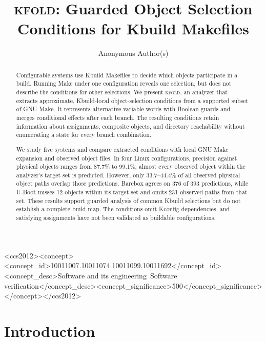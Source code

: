 \documentclass[acmsmall,screen,review]{acmart}
\newcommand{\tool}{\textsc{kfold}\xspace}
\begin{document}
\title{\tool: Guarded Object Selection Conditions for Kbuild Makefiles}

\author{Anonymous Author(s)}

\begin{abstract}
Configurable systems use Kbuild Makefiles to decide which objects participate in a build. Running Make under one configuration reveals one selection, but does not describe the conditions for other selections. We present \tool, an analyzer that extracts approximate, Kbuild-local object-selection conditions from a supported subset of GNU Make. It represents alternative variable words with Boolean guards and merges conditional effects after each branch. The resulting conditions retain information about assignments, composite objects, and directory reachability without enumerating a state for every branch combination.

We study five systems and compare extracted conditions with local GNU Make expansion and observed object files. In four Linux configurations, precision against physical objects ranges from 87.7\% to 99.1\%; almost every observed object within the analyzer's target set is predicted. However, only 33.7--44.4\% of all observed physical object paths overlap those predictions. Barebox agrees on 376 of 393 predictions, while U-Boot misses 12 objects within its target set and omits 231 observed paths from that set. These results support guarded analysis of common Kbuild selections but do not establish a complete build map. The conditions omit Kconfig dependencies, and satisfying assignments have not been validated as buildable configurations.
\end{abstract}

\begin{CCSXML}
<ccs2012><concept><concept_id>10011007.10011074.10011099.10011692</concept_id><concept_desc>Software and its engineering~Software verification</concept_desc><concept_significance>500</concept_significance></concept></ccs2012>
\end{CCSXML}
\maketitle
\pagestyle{plain}

\section{Introduction}
\label{sec:intro}
\end{document}
